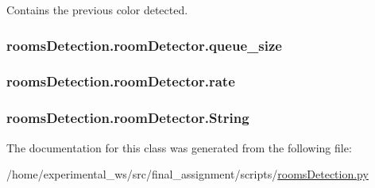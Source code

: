 Contains the previous color detected. 

\subsubsection[{\texorpdfstring{queue\+\_\+size}{queue_size}}]{\setlength{\rightskip}{0pt plus 5cm}rooms\+Detection.\+room\+Detector.\+queue\+\_\+size\hspace{0.3cm}{\ttfamily [static]}}\hypertarget{classroomsDetection_1_1roomDetector_a45ffd5583c2c5b9754964fb80a3baad2}{}\label{classroomsDetection_1_1roomDetector_a45ffd5583c2c5b9754964fb80a3baad2}
\subsubsection[{\texorpdfstring{rate}{rate}}]{\setlength{\rightskip}{0pt plus 5cm}rooms\+Detection.\+room\+Detector.\+rate\hspace{0.3cm}{\ttfamily [static]}}\hypertarget{classroomsDetection_1_1roomDetector_af9b73918d2c339e530129e12ad73fae2}{}\label{classroomsDetection_1_1roomDetector_af9b73918d2c339e530129e12ad73fae2}
\subsubsection[{\texorpdfstring{String}{String}}]{\setlength{\rightskip}{0pt plus 5cm}rooms\+Detection.\+room\+Detector.\+String\hspace{0.3cm}{\ttfamily [static]}}\hypertarget{classroomsDetection_1_1roomDetector_a2d4775447d05df098592bf322c457a03}{}\label{classroomsDetection_1_1roomDetector_a2d4775447d05df098592bf322c457a03}


The documentation for this class was generated from the following file\+:\begin{DoxyCompactItemize}
\item 
/home/experimental\+\_\+ws/src/final\+\_\+assignment/scripts/\hyperlink{roomsDetection_8py}{rooms\+Detection.\+py}\end{DoxyCompactItemize}
